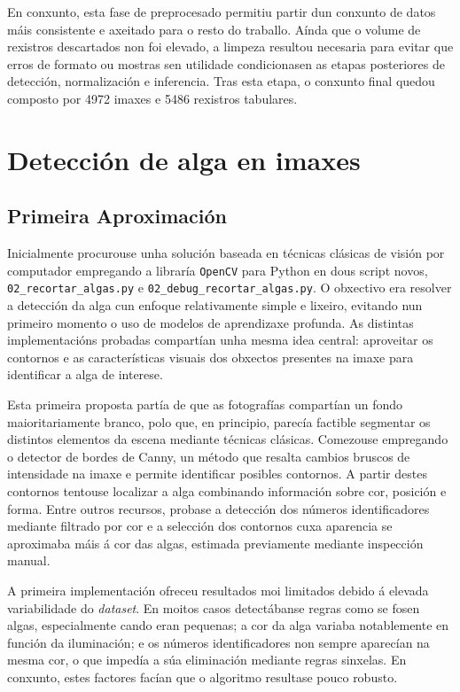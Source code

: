 En conxunto, esta fase de preprocesado permitiu partir dun conxunto de datos máis consistente e
axeitado para o resto do traballo. Aínda que o volume de rexistros descartados non foi elevado, a
limpeza resultou necesaria para evitar que erros de formato ou mostras sen utilidade condicionasen
as etapas posteriores de detección, normalización e inferencia. Tras esta etapa, o conxunto final
quedou composto por 4972 imaxes e 5486 rexistros tabulares.

\section{Detección de alga en imaxes}

\subsection{Primeira Aproximación}
Inicialmente procurouse unha solución baseada en técnicas clásicas de visión por computador
empregando a libraría \texttt{OpenCV} para Python en dous script novos, \\
\texttt{02\_recortar\_algas.py} e \texttt{02\_debug\_recortar\_algas.py}. O obxectivo era resolver a detección da alga cun
enfoque relativamente simple e lixeiro, evitando nun primeiro momento o uso de modelos de
aprendizaxe profunda. As distintas implementacións probadas compartían unha mesma idea central:
aproveitar os contornos e as características visuais dos obxectos presentes na imaxe para identificar
a alga de interese.

Esta primeira proposta partía de que as fotografías compartían un fondo maioritariamente branco, polo
que, en principio, parecía factible segmentar os distintos elementos da escena mediante técnicas
clásicas. Comezouse empregando o detector de bordes de Canny, un método que resalta cambios bruscos
de intensidade na imaxe e permite identificar posibles contornos. A partir destes contornos
tentouse localizar a alga combinando información sobre cor, posición e forma. Entre outros recursos,
probase a detección dos números identificadores mediante filtrado por cor e a selección dos contornos
cuxa aparencia se aproximaba máis á cor das algas, estimada previamente mediante inspección manual.

A primeira implementación ofreceu resultados moi limitados debido á elevada variabilidade do
\textit{dataset}. En moitos casos detectábanse regras como se fosen algas, especialmente cando eran
pequenas; a cor da alga variaba notablemente en función da iluminación; e os números identificadores
non sempre aparecían na mesma cor, o que impedía a súa eliminación mediante regras sinxelas. En
conxunto, estes factores facían que o algoritmo resultase pouco robusto.

